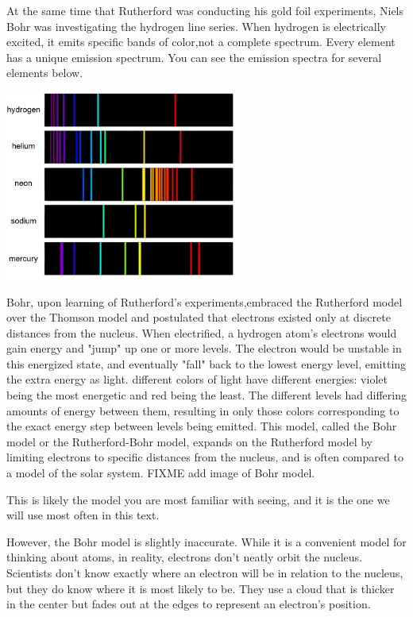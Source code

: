 At the same time that Rutherford was conducting his gold foil experiments, Niels
Bohr was investigating the hydrogen line series. When hydrogen is electrically 
excited, it emits specific bands of color,not a complete spectrum. Every 
element has a unique emission spectrum. You can see the emission spectra for 
several elements below. 

\begin{center}
\noindent\includegraphics[width=3in]{spectral_lines.png}
\end{center}

Bohr, upon learning of Rutherford's experiments,embraced the Rutherford model 
over the Thomson model and postulated that electrons existed only at discrete 
distances from the nucleus. When electrified, a hydrogen atom's electrons 
would gain energy and "jump" up one or more levels. The electron would be 
unstable in this energized state, and eventually "fall" back to the lowest 
energy level, emitting the extra energy as light. different colors of light 
have different energies: violet being the most energetic and red being the 
least. The different levels had differing amounts of energy between them, 
resulting in only those colors corresponding to the exact energy step between 
levels being emitted. This model, called the Bohr model or the Rutherford-Bohr 
model, expands on the Rutherford model by limiting electrons to specific 
distances from the nucleus, and is often compared to a model of the solar 
system.
FIXME add image of Bohr model.

This is likely the model you are most familiar with seeing, and it is the one we
will use most often in this text. 

However, the Bohr model is slightly inaccurate. While it is a convenient model for
thinking about atoms, in reality, electrons don't neatly orbit the nucleus.
Scientists don't know exactly where an electron will be in relation to the
nucleus, but they do know where it is most likely to be. They use a cloud that is
thicker in the center but fades out at the edges to represent an electron's
position.


